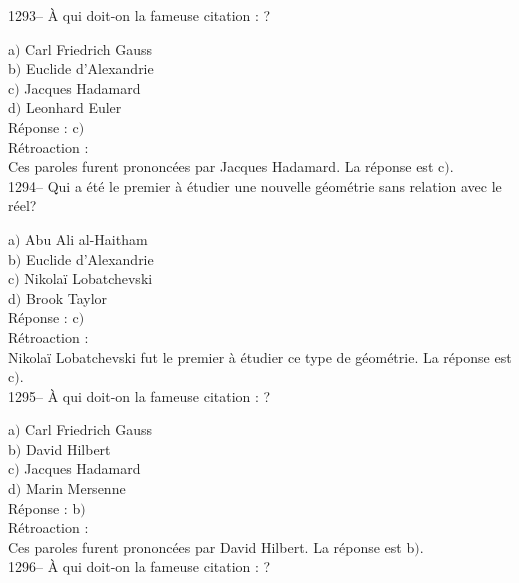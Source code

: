 ﻿\documentclass[letterpaper, 12pt]{article}
\begin{document}
1293-- \`A qui doit-on la fameuse citation : \fg?

a$)$ Carl Friedrich Gauss \\
b$)$ Euclide d'Alexandrie \\
c$)$ Jacques Hadamard \\
d$)$ Leonhard Euler\\

R\'eponse : c$)$\\

R\'etroaction : \\
Ces paroles furent prononc\'ees par Jacques Hadamard.
La r\'eponse est  c$)$.\\

1294-- Qui a \'et\'e le premier \`a \'etudier une nouvelle
g\'eom\'etrie sans relation avec le r\'eel?

a$)$ Abu Ali al-Haitham \\
b$)$ Euclide d'Alexandrie \\
c$)$ Nikola\"i Lobatchevski \\
d$)$ Brook Taylor\\

R\'eponse : c$)$\\

R\'etroaction : \\
Nikola\"i Lobatchevski fut le premier \`a \'etudier ce type de
g\'eom\'etrie.
La r\'eponse est  c$)$.\\

1295-- \`A qui doit-on la fameuse citation : \fg ?

a$)$ Carl Friedrich Gauss \\
b$)$ David Hilbert \\
c$)$ Jacques Hadamard \\
d$)$ Marin Mersenne\\

R\'eponse : b$)$\\

R\'etroaction : \\
Ces paroles furent prononc\'ees par David Hilbert.
La r\'eponse est  b$)$.\\

1296-- \`A qui doit-on la fameuse citation : \fg ?
\end{document}
